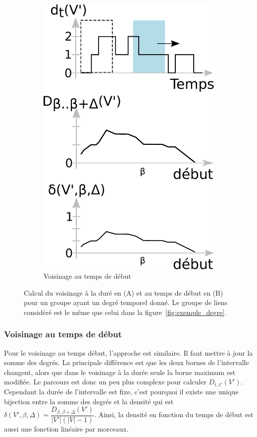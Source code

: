 \begin{figure}
\begin{subfigure}{0.4\textwidth}
		\includegraphics[width=0.8\linewidth]{img/GroupeDense/start_time.eps}
		\caption{Voisinage au temps de début}
		\label{fig:calcul_var_debut}
	\end{subfigure}\hspace*{0.05cm}

	\caption{Calcul du voisinage à la duré en (A) et au temps de début en (B) pour un groupe ayant un degré temporel donné. Le groupe de liens considéré est le même que celui dans la figure~\ref{fig:exemple_degre}.}
	\label{fig:calcul_var_dure_debut.}
\end{figure}

\subsubsection{Voisinage au temps de début}
Pour le voisinage au temps début, l'approche est similaire.
Il faut mettre à jour la somme des degrés.
La principale différence est que les deux bornes de l'intervalle changent, alors que dans le voisinage à la durée seule la borne maximum est modifiée.
Le parcours est donc un peu plus complexe pour calculer $D_{t..t'}(V')$.
Cependant la durée de l'intervalle est fixe, c'est pourquoi il existe une unique bijection entre la somme des degrés et la densité qui est $\delta(V',\beta, \Delta)= \dfrac{D_{\beta..\beta+\Delta}(V')}{|V'|(|V|-1)}$.
Ainsi, la densité en fonction du temps de début est aussi une fonction linéaire par morceaux.

